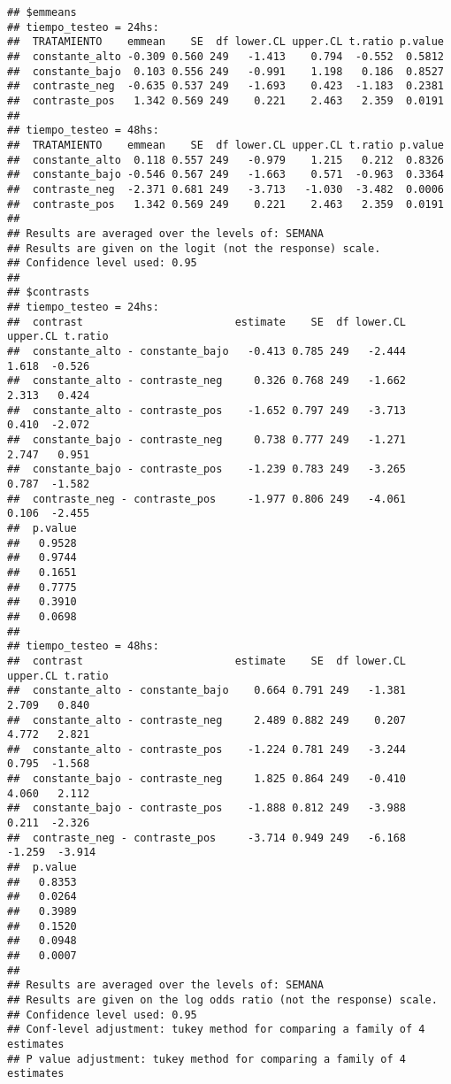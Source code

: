 \documentclass[
]{article}
\begin{document}
\begin{verbatim}
## $emmeans
## tiempo_testeo = 24hs:
##  TRATAMIENTO    emmean    SE  df lower.CL upper.CL t.ratio p.value
##  constante_alto -0.309 0.560 249   -1.413    0.794  -0.552  0.5812
##  constante_bajo  0.103 0.556 249   -0.991    1.198   0.186  0.8527
##  contraste_neg  -0.635 0.537 249   -1.693    0.423  -1.183  0.2381
##  contraste_pos   1.342 0.569 249    0.221    2.463   2.359  0.0191
## 
## tiempo_testeo = 48hs:
##  TRATAMIENTO    emmean    SE  df lower.CL upper.CL t.ratio p.value
##  constante_alto  0.118 0.557 249   -0.979    1.215   0.212  0.8326
##  constante_bajo -0.546 0.567 249   -1.663    0.571  -0.963  0.3364
##  contraste_neg  -2.371 0.681 249   -3.713   -1.030  -3.482  0.0006
##  contraste_pos   1.342 0.569 249    0.221    2.463   2.359  0.0191
## 
## Results are averaged over the levels of: SEMANA 
## Results are given on the logit (not the response) scale. 
## Confidence level used: 0.95 
## 
## $contrasts
## tiempo_testeo = 24hs:
##  contrast                        estimate    SE  df lower.CL upper.CL t.ratio
##  constante_alto - constante_bajo   -0.413 0.785 249   -2.444    1.618  -0.526
##  constante_alto - contraste_neg     0.326 0.768 249   -1.662    2.313   0.424
##  constante_alto - contraste_pos    -1.652 0.797 249   -3.713    0.410  -2.072
##  constante_bajo - contraste_neg     0.738 0.777 249   -1.271    2.747   0.951
##  constante_bajo - contraste_pos    -1.239 0.783 249   -3.265    0.787  -1.582
##  contraste_neg - contraste_pos     -1.977 0.806 249   -4.061    0.106  -2.455
##  p.value
##   0.9528
##   0.9744
##   0.1651
##   0.7775
##   0.3910
##   0.0698
## 
## tiempo_testeo = 48hs:
##  contrast                        estimate    SE  df lower.CL upper.CL t.ratio
##  constante_alto - constante_bajo    0.664 0.791 249   -1.381    2.709   0.840
##  constante_alto - contraste_neg     2.489 0.882 249    0.207    4.772   2.821
##  constante_alto - contraste_pos    -1.224 0.781 249   -3.244    0.795  -1.568
##  constante_bajo - contraste_neg     1.825 0.864 249   -0.410    4.060   2.112
##  constante_bajo - contraste_pos    -1.888 0.812 249   -3.988    0.211  -2.326
##  contraste_neg - contraste_pos     -3.714 0.949 249   -6.168   -1.259  -3.914
##  p.value
##   0.8353
##   0.0264
##   0.3989
##   0.1520
##   0.0948
##   0.0007
## 
## Results are averaged over the levels of: SEMANA 
## Results are given on the log odds ratio (not the response) scale. 
## Confidence level used: 0.95 
## Conf-level adjustment: tukey method for comparing a family of 4 estimates 
## P value adjustment: tukey method for comparing a family of 4 estimates
\end{verbatim}
\end{document}
